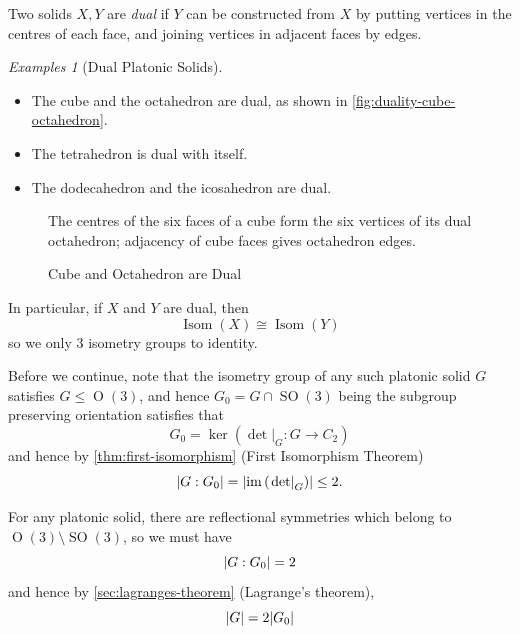 \documentclass{article}
\theoremstyle{definition}
\theoremstyle{remark}
\DeclarePairedDelimiter{\abs}{\lvert}{\rvert}
\newcommand{\pqty}[1]{\left(#1\right)}
\newcommand{\functiondomain}[3]{#1:#2\to #3}
\newcommand{\isomorphic}{\cong}
\newcommand{\subgroup}{\leq}
\newcommand{\img}{\operatorname{im}}
\newtheorem*{examples*}{Examples}
\newcommand{\rightbar}[1]{\left.#1\right|}
\newcommand{\Isom}{\operatorname{Isom}}
\newcommand{\SO}{\operatorname{SO}}
\newcommand{\Or}{\operatorname{O}}
\begin{document}
Two solids \(X, Y\) are \emph{dual} if \(Y\) can be constructed from \(X\) by putting vertices in the centres of each face, and joining vertices in adjacent faces by edges.

\begin{examples*}[Dual Platonic Solids]
    \begin{itemize}
        \item The cube and the octahedron are dual, as shown in \autoref{fig:duality-cube-octahedron}.
        \item The tetrahedron is dual with itself.
        \item The dodecahedron and the icosahedron are dual.
    \end{itemize}
\end{examples*}

\begin{figure}[ht!]
    \centering
    \par The centres of the six faces of a cube form the six vertices of its dual octahedron; adjacency of cube faces gives octahedron edges.\par

    \caption{Cube and Octahedron are Dual}
    \label{fig:duality-cube-octahedron}
\end{figure}

In particular, if \(X\) and \(Y\) are dual, then
\[
    \Isom\pqty{X} \isomorphic \Isom\pqty{Y}
\]
so we only 3 isometry groups to identity.

Before we continue, note that the isometry group of any such platonic solid \(G\) satisfies \(G \subgroup \Or\pqty{3}\), and hence \(G_0 = G \cap \SO\pqty{3}\) being the subgroup preserving orientation satisfies that
\[
    G_0 = \ker \pqty{\functiondomain{\rightbar{\det}_{G}}{G}{C_2}}
\]
and hence by \autoref{thm:first-isomorphism} (First Isomorphism Theorem)
\[
    \abs{G : G_0} = \abs{\img \pqty{\rightbar{\det}_{G}}} \leq 2.
\]

For any platonic solid, there are reflectional symmetries which belong to \(\Or\pqty{3} \setminus \SO\pqty{3}\), so we must have
\[
    \abs{G : G_0} = 2
\]
and hence by \autoref{sec:lagranges-theorem} (Lagrange's theorem),
\[
    \abs{G} = 2 \abs{G_0}
\]
\end{document}
